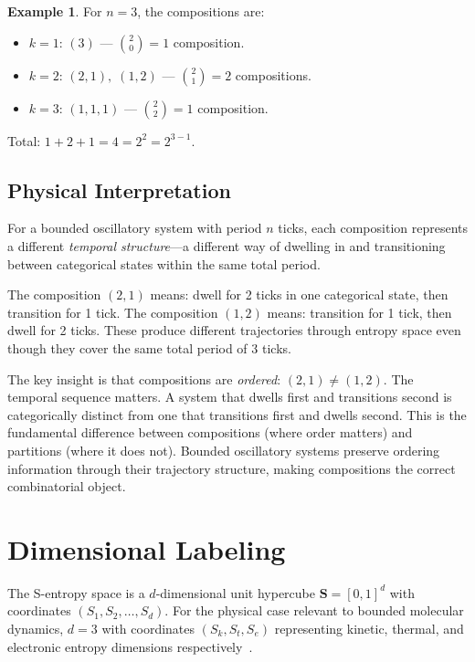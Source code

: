 \documentclass[twocolumn,10pt,a4paper]{article}
\theoremstyle{definition}
\newtheorem{example}[theorem]{Example}
\theoremstyle{remark}
\newcommand{\Sk}{S_k}
\newcommand{\St}{S_t}
\newcommand{\Se}{S_e}
\begin{document}
\begin{example}
\label{ex:n3}
For $n = 3$, the compositions are:
\begin{itemize}
\item $k=1$: $(3)$ --- $\binom{2}{0} = 1$ composition.
\item $k=2$: $(2,1),\; (1,2)$ --- $\binom{2}{1} = 2$ compositions.
\item $k=3$: $(1,1,1)$ --- $\binom{2}{2} = 1$ composition.
\end{itemize}
Total: $1 + 2 + 1 = 4 = 2^2 = 2^{3-1}$. \checkmark
\end{example}

\subsection{Physical Interpretation}

For a bounded oscillatory system with period $n$ ticks, each composition represents a different \emph{temporal structure}---a different way of dwelling in and transitioning between categorical states within the same total period.

The composition $(2,1)$ means: dwell for 2 ticks in one categorical state, then transition for 1 tick. The composition $(1,2)$ means: transition for 1 tick, then dwell for 2 ticks. These produce different trajectories through entropy space even though they cover the same total period of 3 ticks.

The key insight is that compositions are \emph{ordered}: $(2,1) \neq (1,2)$. The temporal sequence matters. A system that dwells first and transitions second is categorically distinct from one that transitions first and dwells second. This is the fundamental difference between compositions (where order matters) and partitions (where it does not). Bounded oscillatory systems preserve ordering information through their trajectory structure, making compositions the correct combinatorial object.


\section{Dimensional Labeling}
\label{sec:labeling}

The S-entropy space is a $d$-dimensional unit hypercube $\mathbf{S} = [0,1]^d$ with coordinates $(S_1, S_2, \ldots, S_d)$. For the physical case relevant to bounded molecular dynamics, $d = 3$ with coordinates $(\Sk, \St, \Se)$ representing kinetic, thermal, and electronic entropy dimensions respectively~\cite{sachikonye2025bounded}.
\end{document}
